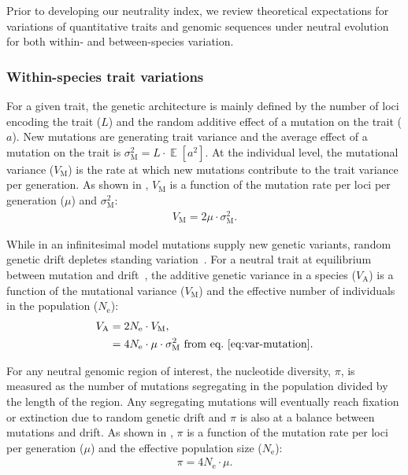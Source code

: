 \documentclass{article}
\newcommand{\Multiply}{\cdot}
\DeclareMathOperator{\E}{\mathbb{E}}
\newcommand{\Ne}{N_{\text{e}}}
\newcommand{\MutationRate}{\mu}
\newcommand{\NbrLoci}{L}
\newcommand{\VarGenetic}{V_{\mathrm{A}}}
\newcommand{\VarMutation}{V_{\mathrm{M}}}
\newcommand{\RateMut}{\sigma^2_{\mathrm{M}}}
\begin{document}
Prior to developing our neutrality index, we review theoretical expectations for variations of quantitative traits and genomic sequences under neutral evolution for both within- and between-species variation.

\subsubsection*{Within-species trait variations}

For a given trait, the genetic architecture is mainly defined by the number of loci encoding the trait ($\NbrLoci$) and the random additive effect of a mutation on the trait ($a$).
New mutations are generating trait variance and the average effect of a mutation on the trait is $\RateMut = \NbrLoci \Multiply  \E [a^2]$.
At the individual level, the mutational variance ($\VarMutation$) is the rate at which new mutations contribute to the trait variance per generation.
As shown in \textcite{lande_quantitative_1979, lande_sexual_1980}, $\VarMutation$ is a function of the mutation rate per loci per generation ($\MutationRate$) and $\RateMut$:
\begin{gather}
    \VarMutation = 2 \MutationRate \Multiply \RateMut \label{eq:var-mutation}.
\end{gather}

While in an infinitesimal model mutations supply new genetic variants, random genetic drift depletes standing variation~\parencite{turelli_commentary_2017, barton_infinitesimal_2017, sella_thinking_2019}.
For a neutral trait at equilibrium between mutation and drift~\parencite{lynch_mutation_1998}, the additive genetic variance in a species ($\VarGenetic$) is a function of the mutational variance ($\VarMutation$) and the effective number of individuals in the population ($\Ne$):
\begin{align}
    \VarGenetic & =  2 \Ne \Multiply \VarMutation, \\
    & = 4 \Ne \Multiply \MutationRate \Multiply \RateMut \text{ from eq.~\ref{eq:var-mutation}}\label{eq:var-genetic}.
\end{align}

For any neutral genomic region of interest, the nucleotide diversity, $\pi$, is measured as the number of mutations segregating in the population divided by the length of the region.
Any segregating mutations will eventually reach fixation or extinction due to random genetic drift and $\pi$ is also at a balance between mutations and drift.
As shown in \textcite{tajima_statistical_1989}, $\pi$ is a function of the mutation rate per loci per generation ($\MutationRate$) and the effective population size ($\Ne$):
\begin{gather}
    \pi = 4 \Ne \Multiply \MutationRate \label{eq:genetic-diversity}.
\end{gather}
\end{document}

